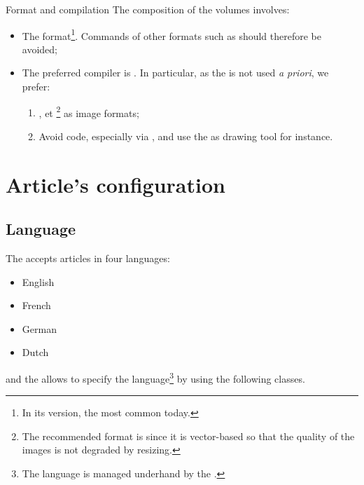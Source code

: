 \documentclass[english,nolocaltoc]{nwejmart}
\newtheorem[style=definition]{fact}
\newtheorem[title-plural=Criteria]{criterion}
\newtheorem[title=random experiment]{rexp}
\begin{document}
\begin{dbwarning}{Format and  compilation}{}
  The composition of the \nwejm*{} volumes involves:
  \begin{itemize}
  \item The  format\footnote{In its  version, the most
      common today.}. Commands of other formats such as  should therefore be avoided;
  \item The preferred compiler is . In particular, as the  is not used \emph{a priori}, we prefer:
    \begin{enumerate}
    \item {},  et
      \footnote{The recommended format is  since it is vector-based so that the quality of the images is not degraded by resizing.} as image formats;
    \item Avoid  code, especially via
      , and use the  as drawing tool
      for instance.
    \end{enumerate}
  \end{itemize}
\end{dbwarning}

\section{Article's configuration}

\subsection{Language}
\label{sec:langue-de-larticle}

The \nwejm{} accepts articles in four languages:
\begin{itemize}
\item English
\item French
\item German
\item Dutch
\end{itemize}
and the \nwejmauthorcl{} allows to specify the language\footnote{The language is managed underhand by the .} by using the following classes.
\end{document}
